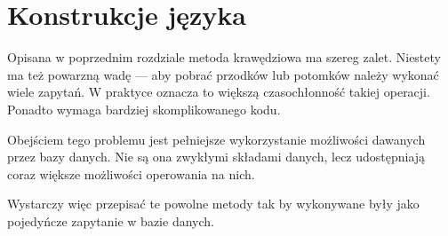 \chapter{Konstrukcje języka}

% 
% 
% 


Opisana w poprzednim rozdziale metoda krawędziowa ma szereg zalet.
Niestety ma też powarzną wadę --- aby pobrać przodków lub potomków należy wykonać wiele zapytań.
W praktyce oznacza to większą czasochłonność takiej operacji. 
Ponadto wymaga bardziej skomplikowanego kodu.

Obejściem tego problemu jest pełniejsze wykorzystanie możliwości dawanych przez bazy danych.
Nie są ona zwykłymi składami danych, lecz udostępniają coraz większe możliwości operowania na nich.

Wystarczy więc przepisać te powolne metody tak by wykonywane były jako pojedyńcze zapytanie w bazie danych.

